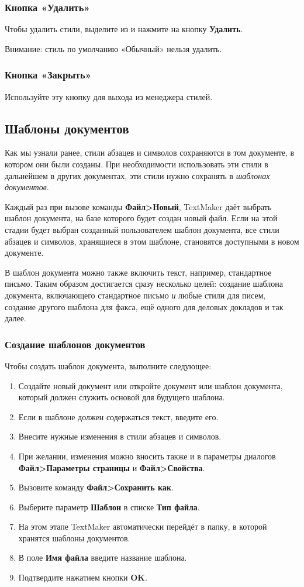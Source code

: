 ﻿\documentclass[a4paper,10pt]{article}
\begin{document}
\subsubsection{Кнопка «Удалить»}
Чтобы удалить стили, выделите из и нажмите на кнопку \textbf{Удалить}.

Внимание: стиль по умолчанию «Обычный» нельзя удалить.

\subsubsection{Кнопка «Закрыть»}
Используйте эту кнопку для выхода из менеджера стилей.

\subsection{Шаблоны документов} \label{sec:шаблоныдокументов}
Как мы узнали ранее, стили абзацев и символов сохраняются в том документе, в котором они были созданы. При необходимости использовать эти стили в дальнейшем в других документах, эти стили нужно сохранять в \textit{шаблонах документов}.

Каждый раз при вызове команды \textbf{Файл>Новый}, TextMaker даёт выбрать шаблон документа, на базе которого будет создан новый файл. Если на этой стадии будет выбран  созданный пользователем шаблон документа, все стили абзацев и символов, хранящиеся в этом шаблоне, становятся доступными в новом документе.

В шаблон документа можно также включить текст, например, стандартное письмо. Таким образом достигается сразу несколько целей: создание шаблона документа, включающего стандартное письмо \textit{и} любые стили для писем, создание другого шаблона для факса, ещё одного для деловых докладов и так далее.

\subsubsection{Создание шаблонов документов}
Чтобы создать шаблон документа, выполните следующее:
\begin{enumerate}
 \item Создайте новый документ или откройте документ или шаблон документа, который должен служить основой для будущего шаблона.
 \item Если в шаблоне должен содержаться текст, введите его.
 \item Внесите нужные изменения в стили абзацев и символов.
 \item При желании, изменения можно вносить также и в параметры диалогов \textbf{Файл>Параметры страницы} и \textbf{Файл>Свойства}.
 \item Вызовите команду \textbf{Файл>Сохранить как}.
 \item Выберите параметр \textbf{Шаблон} в списке \textbf{Тип файла}.
 \item На этом этапе TextMaker автоматически перейдёт в папку, в которой хранятся шаблоны документов.
 \item В поле \textbf{Имя файла} введите название шаблона.
 \item Подтвердите нажатием кнопки \textbf{OK}.
\end{enumerate}
\end{document}
